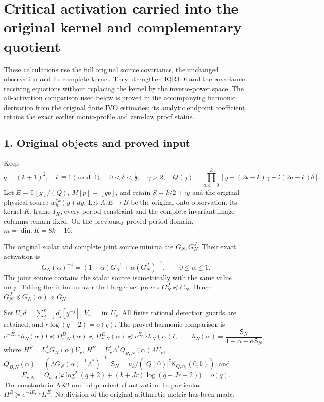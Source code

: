 \section{Critical activation carried into the original kernel and complementary quotient}\label{critical-activation-carried-into-the-original-kernel-and-complementary-quotient}

These calculations use the full original source covariance, the unchanged observation and its complete kernel. They strengthen IQR1--6 and the covariance receiving equations without replacing the kernel by the inverse-power space. The all-activation comparison used below is proved in the accompanying harmonic derivation from the original finite IVO estimates; its analytic endpoint coefficient retains the exact earlier monic-profile and zero-law proof status.

\subsection{1. Original objects and proved input}\label{original-objects-and-proved-input}

Keep \[
q=(k+1)^2,\quad k\equiv1\pmod4,\quad 0<\delta<\tfrac12,\quad\gamma>2,
\quad Q(y)=\prod_{a,b=0}^k[y-(2b-k)\gamma+i(2a-k)\delta].
\] Let \(E=\mathbb C[y]/(Q)\), \(M[p]=[yp]\), and retain \(S=k/2+iy\) and the original physical source \(w_h^{*k}(y)\,dy\). Let \(\Lambda:E\to B\) be the original onto observation. Its kernel \(K\), frame \(I_K\), every period constraint and the complete invariant-image columns remain fixed. On the previously proved period domain, \(m=\dim K=8k-16\).

The original scalar and complete joint source minima are \(G_N,G_N^J\). Their exact activation is \[
G_N(\alpha)^{-1}=(1-\alpha)G_N^{-1}+\alpha(G_N^J)^{-1},
\qquad 0\le\alpha\le1. \tag{AK1}
\] The joint source contains the scalar source isometrically with the same value map. Taking the infimum over that larger set proves \(G_N^J\preceq G_N\). Hence \(G_N^J\preceq G_N(\alpha)\preceq G_N\).

Set \(U_rd=\sum_{j=1}^rd_j[y^{-j}]\), \(V_r=\operatorname{im}U_r\). All finite rational detection guards are retained, and \(r\log(q+2)=o(q)\). The proved harmonic comparison is \[
e^{-E_{r,N}}h_N(\alpha)I
 \preceq H^B_{r,N}(\alpha)\preceq H^E_{r,N}(\alpha)
 \preceq e^{E_{r,N}}h_N(\alpha)I,\qquad
h_N(\alpha)=\frac{\mathsf S_N}{1-\alpha+\alpha\mathsf S_N},
\tag{AK2}
\] where \(H^E=U_r^*G_N(\alpha)U_r\), \(H^B=U_r^*\Lambda^*Q_{B,N}(\alpha)\Lambda U_r\), \(Q_{B,N}(\alpha)=(\Lambda G_N(\alpha)^{-1}\Lambda^*)^{-1}\), \(\mathsf S_N=u_k/(|Q(0)|^2\mathsf K_{Q,n_0}(0,0))\), and \[
E_{r,N}=O_{h,A}\bigl(k\log^2(q+2)+(k+Jr)\log(q+Jr+2)\bigr)=o(q).
\] The constants in AK2 are independent of activation. In particular, \(H^B\succeq e^{-2E_{r,N}}H^E\). No division of the original arithmetic metric has been made.

